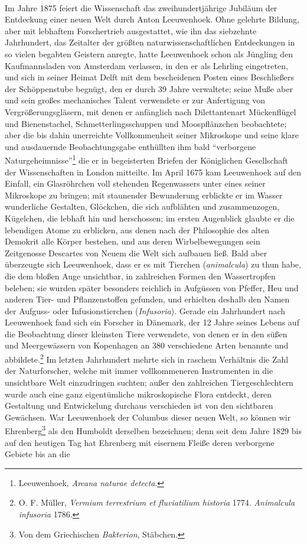 \documentclass[a4paper, 11pt, oneside, english]{article}
\begin{document}
\paragraph{}
Im Jahre 1875 feiert die Wissenschaft das zweihundertjährige Jubiläum der Entdeckung einer neuen Welt durch Anton Leeuwenhoek. Ohne gelehrte Bildung, aber mit lebhaftem Forschertrieb ausgestattet, wie ihn das siebzehnte Jahrhundert, das Zeitalter der größten naturwissenschaftlichen Entdeckungen in so vielen begabten Geistern anregte, hatte Leeuwenhoek schon als Jüngling den Kaufmannsladen von Amsterdam verlassen, in den er als Lehrling eingetreten, und sich in seiner Heimat Delft mit dem bescheidenen Posten eines Beschließers der Schöppenstube begnügt, den er durch 39 Jahre verwaltete; seine Muße aber und sein großes mechanisches Talent verwendete er zur Anfertigung von Vergrößerungsgläsern, mit denen er anfänglich nach Dilettantenart Mückenflügel und Bienenstachel, Schmetterlingsschuppen und Moospflänzchen beobachtete; aber die bis dahin unerreichte Vollkommenheit seiner Mikroskope und seine klare und ausdauernde Beobachtungsgabe enthüllten ihm bald "`verborgene Naturgeheimnisse"'\footnote{Leeuwenhoek, \emph{Arcana naturae detecta}.} die er in begeisterten Briefen der Königlichen Gesellschaft der Wissenschaften in London mitteilte. Im April 1675 kam Leeuwenhoek auf den Einfall, ein Glasröhrchen voll stehenden Regenwassers unter eines seiner Mikroskope zu bringen; mit staunender Bewunderung erblickte er im Wasser wunderliche Gestalten, Glöckchen, die sich aufblähten und zusammenzogen, Kügelchen, die lebhaft hin und herschossen; im ersten Augenblick glaubte er die lebendigen Atome zu erblicken, aus denen nach der Philosophie des alten Demokrit alle Körper bestehen, und aus deren Wirbelbewegungen sein Zeitgenosse Descartes von Neuem die Welt sich aufbauen ließ. Bald aber überzeugte sich Leeuwenhoek, dass er es mit Tierchen (\emph{animalcula}) zu thun habe, die dem bloßen Auge unsichtbar, in zahlreichen Formen den Wassertropfen beleben; sie wurden später besonders reichlich in Aufgüssen von Pfeffer, Heu und anderen Tier- und Pflanzenstoffen gefunden, und erhielten deshalb den Namen der Aufguss- oder Infusionstierchen (\emph{Infusoria}). Gerade ein Jahrhundert nach Leeuwenhoek fand sich ein Forscher in Dänemark, der 12 Jahre seines Lebens auf die Beobachtung dieser kleinsten Tiere verwendete, von denen er in den süßen und Meergewässern von Kopenhagen an 380 verschiedene Arten benannte und abbildete.\footnote{O. F. Müller, \emph{Vermium terrestrium et fluviatilium historia} 1774. \emph{Animalcula infusoria} 1786.} Im letzten Jahrhundert mehrte sich in raschem Verhältnis die Zahl der Naturforscher, welche mit immer vollkommeneren Instrumenten in die unsichtbare Welt einzudringen suchten; außer den zahlreichen Tiergeschlechtern wurde auch eine ganz eigentümliche mikroskopische Flora entdeckt, deren Gestaltung und Entwickelung durchaus verschieden ist von den sichtbaren Gewächsen. War Leeuwenhoek der Columbus dieser neuen Welt, so können wir Ehrenberg\footnote{Von dem Griechischen \emph{Bakterion}, Stäbchen.} als den Humboldt derselben bezeichnen; denn seit dem Jahre 1829 bis auf den heutigen Tag hat Ehrenberg mit eisernem Fleiße deren verborgene Gebiete bis an die 
\end{document}
